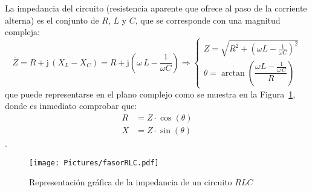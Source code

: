 \documentclass[11pt]{book} %
\numberwithin{dummy}{section}
\theoremstyle{ocrenumbox}
\theoremstyle{blacknumex}
\theoremstyle{blacknumbox}
\theoremstyle{ocrenum}
\newlength\esp
\begin{document}
	La impedancia del circuito (resistencia aparente que ofrece al paso de la corriente alterna) es el conjunto de $R$, $L$ y $C$, que se corresponde con una magnitud compleja: 
	\begin{equation}
		\boxed{ \overline{Z} = R + \mathrm{j}\,(X_L-X_C) = R+ \mathrm{j}\left(\omega\,L-\dfrac{1}{\omega C}\right) \Rightarrow 
			\begin{cases}
				Z=\sqrt{R^2+\left(\omega L -\frac{1}{\omega C} \right)^2}\\
				\theta=\arctan\left(\dfrac{\omega L-\frac{1}{\omega\,C}}{R} \right)
		\end{cases}}
	\end{equation}
	que puede representarse en el plano complejo como se muestra en la Figura~\ref{fig.fasorRLC}, donde es inmediato comprobar que:
	\begin{align*}
		R&=Z\cdot\cos(\theta)\\
		X&=Z\cdot\sin(\theta)
	\end{align*}. 
	\begin{figure}[htbp]
		\centering
		\texttt{[image: Pictures/fasorRLC.pdf]}
		\caption{Representación gráfica de la impedancia de un circuito $RLC$}
		\label{fig.fasorRLC}
	\end{figure}
	
\end{document}
